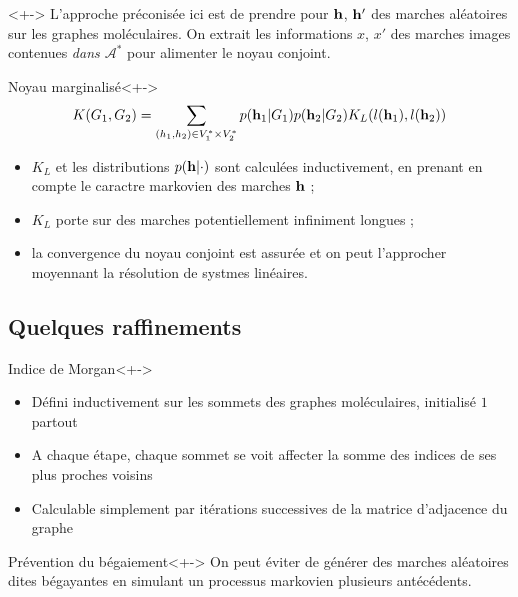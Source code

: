 \begin{frame}
\begin{block}{}<+->
L'approche pr\'econis\'ee ici est de prendre pour $\mathbf{h}$, $\mathbf{h}'$ des marches al\'eatoires sur les graphes mol\'eculaires. %
On extrait les informations $x$, $x'$ des marches images contenues \emph{dans $\mathcal{A}^{\ast}$} pour alimenter le noyau conjoint.
\end{block}
\begin{block}{Noyau marginalis\'e}<+->
\[K(G_1,G_2) = \sum\limits_{(h_1,h_2) \in V_1^{\ast} \times V_2^{\ast}}p(\mathbf{h}_1|G_1)p(\mathbf{h}_2|G_2)K_L(l(\mathbf{h}_1),l(\mathbf{h}_2))\]
\end{block}
\end{frame}

\begin{frame}
\begin{itemize}
\item<+-> $K_L$ et les distributions $p(\mathbf{h}|\cdot)$ sont calcul\'ees inductivement, en prenant en compte le caractre markovien des marches $\mathbf{h}$ ;
\item<+-> $K_L$ porte sur des marches potentiellement infiniment longues ;
\item<+-> la convergence du noyau conjoint est assur\'ee et on peut l'approcher moyennant la r\'esolution de systmes lin\'eaires.
\end{itemize}
\end{frame}

\subsection{Quelques raffinements}

\begin{frame}
\begin{block}{Indice de Morgan}<+->
\begin{itemize}
\item<+-> D\'efini inductivement sur les sommets des graphes mol\'eculaires, initialis\'e  $1$ partout
\item<+-> A chaque \'etape, chaque sommet se voit affecter la somme des indices de ses plus proches voisins
\item<+-> Calculable simplement par it\'erations successives de la matrice d'adjacence du graphe
\end{itemize}
\end{block}
\begin{block}{Pr\'evention du b\'egaiement}<+->
On peut \'eviter de g\'en\'erer des marches al\'eatoires dites b\'egayantes en simulant un processus markovien  plusieurs ant\'ec\'edents.
\end{block}
\end{frame}

